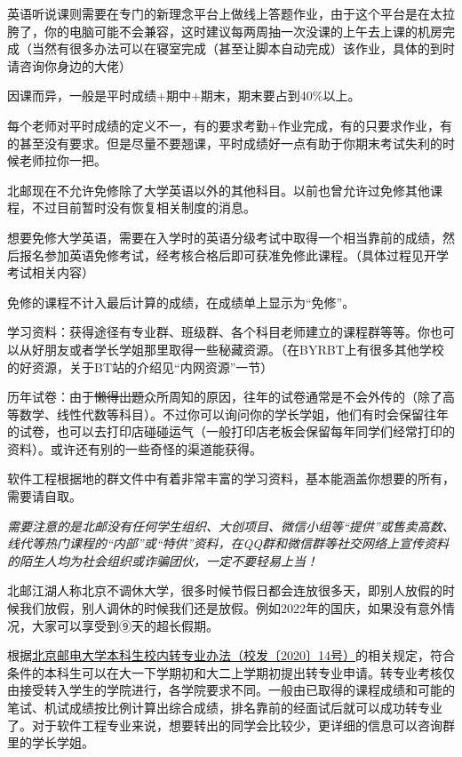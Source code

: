 英语听说课则需要在专门的新理念平台上做线上答题作业，由于这个平台是在太拉胯了，你的电脑可能不会兼容，这时建议每两周抽一次没课的上午去上课的机房完成（当然有很多办法可以在寝室完成（甚至让脚本自动完成）该作业，具体的到时请咨询你身边的大佬）



因课而异，一般是平时成绩+期中+期末，期末要占到40\%以上。

每个老师对平时成绩的定义不一，有的要求考勤+作业完成，有的只要求作业，有的甚至没有要求。但是尽量不要翘课，平时成绩好一点有助于你期末考试失利的时候老师拉你一把。


北邮现在不允许免修除了大学英语以外的其他科目。以前也曾允许过免修其他课程，不过目前暂时没有恢复相关制度的消息。

想要免修大学英语，需要在入学时的英语分级考试中取得一个相当靠前的成绩，然后报名参加英语免修考试，经考核合格后即可获准免修此课程。（具体过程见开学考试相关内容）

免修的课程不计入最后计算的成绩，在成绩单上显示为“免修”。


学习资料：获得途径有专业群、班级群、各个科目老师建立的课程群等等。你也可以从好朋友或者学长学姐那里取得一些秘藏资源。（在BYRBT上有很多其他学校的好资源，关于BT站的介绍见“内网资源”一节）

历年试卷：由于\sout{懒得出题}众所周知的原因，往年的试卷通常是不会外传的（除了高等数学、线性代数等科目）。不过你可以询问你的学长学姐，他们有时会保留往年的试卷，也可以去打印店碰碰运气（一般打印店老板会保留每年同学们经常打印的资料）。或许还有别的一些奇怪的渠道能获得。

软件工程根据地的群文件中有着非常丰富的学习资料，基本能涵盖你想要的所有，需要请自取。

\emph{需要注意的是北邮没有任何学生组织、大创项目、微信小组等“提供”或售卖高数、线代等热门课程的“内部”或“特供”资料，在QQ群和微信群等社交网络上宣传资料的陌生人均为社会组织或诈骗团伙，一定不要轻易上当！}


北邮江湖人称北京不调休大学，很多时候节假日都会连放很多天，即别人放假的时候我们放假，别人调休的时候我们还是放假。例如2022年的国庆，如果没有意外情况，大家可以享受到⑨天的超长假期。


根据\href{http://my.bupt.edu.cn/content.jsp?urltype=news.NewsContentUrl&wbtreeid=1036&wbnewsid=25646}{北京邮电大学本科生校内转专业办法（校发〔2020〕14号）}的相关规定，符合条件的本科生可以在大一下学期初和大二上学期初提出转专业申请。转专业考核仅由接受转入学生的学院进行，各学院要求不同。一般由已取得的课程成绩和可能的笔试、机试成绩按比例计算出综合成绩，排名靠前的经面试后就可以成功转专业了。对于软件工程专业来说，想要转出的同学会比较少，更详细的信息可以咨询群里的学长学姐。
